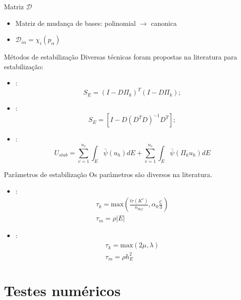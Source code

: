 \documentclass{beamer}
\begin{document}
\begin{frame}{Matriz $\mathcal{D}$}
    \begin{itemize}
        \item Matriz de mudança de bases: polinomial $\rightarrow$ canonica
        \item $\mathcal{D}_{i\alpha} = \chi_i(p_\alpha)$
    \end{itemize}
\end{frame}

\begin{frame}{Métodos de estabilização}
    Diversas técnicas foram propostas na literatura para estabilização:
    \begin{itemize}
        \item \cite{basicprinciplesvirtualelementmethods2013a}: $$S_E = (I - D\Pi_k)^T(I - D\Pi_k);$$
        \item \cite{arbitraryorder2dvirtualelementspolygonalmeshespartelasticproblem2017a}: $$S_E = \left[I - D(D^TD)^{-1}D^T \right];$$
        \item \cite{wriggers2017efficient}: $$U_{stab} = \sum_{v=1}^{n_v}\int_E \bar{\psi}(u_h)dE + \sum_{v=1}^{n_v}\int_E \bar{\psi}(\Pi_k u_h)dE$$
    \end{itemize}    
\end{frame}

\begin{frame}{Parâmetros de estabilização}
    Os parâmetros são diversos na literatura. 
    \begin{itemize}
        \item \cite{numericalrecipeselastodynamicvirtualelementmethodsexplicittimeintegration2020}: $$\begin{aligned}
            \tau_k = \text{max}\left(\frac{tr(K^{c})}{n_{dof}}, \alpha_0 \frac{\mathbb{C}}{3}\right)\\
            \tau_m = \rho |E|     
            \end{aligned}$$
        \item \cite{virtualelementmethodlinearelastodynamicsmodelsconvergencestabilitydissipationdispersionanalysis2019}: $$\begin{aligned}
            \tau_k = \text{max}\left(2\mu , \lambda \right)\\
            \tau_m = \rho h_E^2     
            \end{aligned}$$
    \end{itemize}
\end{frame}

\section{Testes numéricos}
\end{document}

